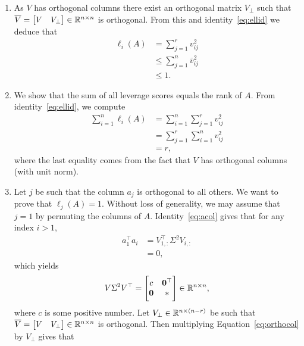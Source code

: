 \documentclass{article}
\begin{document}
\begin{enumerate}[label=\alph*)]
\item As $V$ has orthogonal columns there exist an orthogonal matrix $V_\bot$
  such that $\overline{V} =
  \begin{bmatrix}
    V & V_\bot
  \end{bmatrix} \in {\mathbb R}^{n \times n}
  $ is orthogonal.
  From this and identity~\eqref{eq:ellid} we deduce that
  \begin{align*}
    \ell_i(A) &= \sum_{j = 1}^r v_{ij}^2\\
              &\leq \sum_{j = 1}^n \overline{v}_{ij}^2\\
              &\leq 1.
  \end{align*}
\item We show that the sum of all leverage scores equals the rank of $A$.
  From identity~\ref{eq:ellid}, we compute
  \begin{align*}
    \sum_{i = 1}^n \ell_i(A) &= \sum_{i = 1}^n \sum_{j = 1}^r v_{ij}^2\\
                            &= \sum_{j = 1}^r \sum_{i = 1}^n v_{ij}^2\\
                            &= r,
  \end{align*}
  where the last equality comes from the fact that $V$ has orthogonal columns
  (with unit norm).
\item Let $j$ be such that the column $a_j$ is orthogonal to all others.
  We want to prove that $\ell_j(A) = 1$.
  Without loss of generality, we may
  assume that $j = 1$ by permuting the columns of $A$.
  Identity~\eqref{eq:acol} gives that for any index $i > 1$,
  \begin{align*}
    a_1^\top a_i &= V_{1,:}^\top \Sigma^2 V_{i,:}\\
    &= 0,
  \end{align*}
  which yields
  \begin{align}\label{eq:orthocol}
    V \Sigma^2 V^\top =
    \begin{bmatrix*}
      c & \zeros^\top\\
      \zeros & *
    \end{bmatrix*} \in \reals^{n \times n},
  \end{align}
  where $c$ is some positive number.
  Let $V_\bot \in {\mathbb R}^{n \times (n - r)}$ be such that $\overline{V} =
  \begin{bmatrix}
    V & V_\bot
  \end{bmatrix} \in {\mathbb R}^{n \times n}
  $ is orthogonal.
  Then multiplying Equation~\eqref{eq:orthocol} by $V_\bot$ gives that

\end{enumerate}
\end{document}
